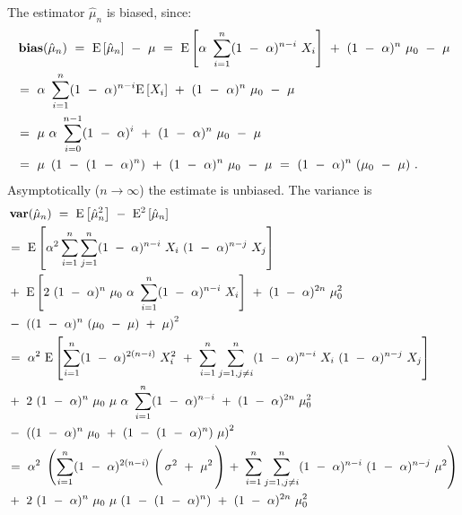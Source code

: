 \documentclass{article}
\newcommand\EXP{\mathbf{\mathrm{E}}}
\newcommand{\bias}{\mathop{\bf bias}}
\newcommand{\var}{\mathop{\bf var}}
\begin{document}
\begin{appendices}
The estimator $\hat{\mu}_n$ is biased, since:
\begin{align}
  &\bias(\hat{\mu}_n) \ = \ \EXP \left[\hat{\mu}_n \right] \ - \ \mu \ = \
  \EXP \left[  \alpha \ \sum_{i=1}^{n}  (1 \ - \ \alpha)^{n-i} \ X_i
  \right] \ + \ (1 \ - \ \alpha)^{n} \ \mu_0 \ - \ \mu \\ \nonumber
  &= \ \alpha \ \sum_{i=1}^{n}  (1 \ - \ \alpha)^{n-i} \EXP \left[X_i\right] \ + \ (1 \ - \ \alpha)^{n} \ \mu_0
 \ - \ \mu \\ \nonumber
  &= \ \mu \ \alpha \ \sum_{i=0}^{n-1}  (1 \ - \ \alpha)^i \ + \ (1 \ - \ \alpha)^{n} \ \mu_0
 \ - \ \mu \\ \nonumber
 &= \ \mu \ \left(1 \ - \  (1 \ - \ \alpha)^{n} \right)  \ + \ (1 \ - \ \alpha)^{n} \ \mu_0 \ - \ \mu
 \ = \   (1 \ - \ \alpha)^{n} \ (\mu_0 \ - \ \mu) \ .
\end{align}
Asymptotically ($n \to \infty$) the estimate is unbiased.
The variance is
\begin{align}
  &\var (\hat{\mu}_n) \ = \ \EXP \left[\hat{\mu}_n^2 \right] \ - \  \EXP^2
  \left[\hat{\mu}_n \right] \\ \nonumber
  &= \ \EXP \left[  \alpha^2 \sum_{i=1}^{n} \sum_{j=1}^{n}
    (1 \ - \ \alpha)^{n-i} \ X_i\ (1 \ - \ \alpha)^{n-j} \ X_j\right]
    \\ \nonumber 
    &+ \ \EXP \left[2\ (1 \ - \ \alpha)^{n} \ \mu_0 \ \alpha \ \sum_{i=1}^{n}  (1 \  - \ \alpha)^{n-i} \ X_i  \right] \ + \ (1 \ - \ \alpha)^{2n} \ \mu_0^2 
    \\ \nonumber &- \
     \left( (1 \ - \ \alpha)^{n} \ (\mu_0 \ - \ \mu) \ + \ \mu \right)^2 \\ \nonumber
  &= \ \alpha^2 \ \EXP \left[ \sum_{i=1}^{n}
    (1 \ - \ \alpha)^{2(n-i)} \ X_i^2 \ + \  \sum_{i=1}^{n} \sum_{j=1,j\not=i}^{n}
    (1 \ - \ \alpha)^{n-i} \ X_i\ (1 \ - \ \alpha)^{n-j} \ X_j\right]
    \\ \nonumber 
    &+ \ 2\ (1 \ - \ \alpha)^{n} \ \mu_0 \ \mu \ \alpha \ \sum_{i=1}^{n}  (1 \  - \ \alpha)^{n-i}  \ + \ (1 \ - \ \alpha)^{2n} \ \mu_0^2 
      \\ \nonumber &- \ \left( (1 \ - \ \alpha)^{n} \ \mu_0 \ + \ (1 \ - \  (1 \ - \ \alpha)^{n} ) \ \mu  \right)^2 \\ \nonumber
  &= \ \alpha^2 \ \left( \sum_{i=1}^{n}
    (1 \ - \ \alpha)^{2(n-i)} \ \right(\sigma^2 \ + \ \mu^2 \left) \ + \
    \sum_{i=1}^{n} \sum_{j=1,j\not=i}^{n}
    (1 \ - \ \alpha)^{n-i} \ (1\ - \ \alpha)^{n-j} \ \mu^2 \right) 
    \\ \nonumber 
    &+ \ 2\ (1 \ - \ \alpha)^{n} \ \mu_0 \ \mu \ (1 \ - \  (1 \  - \ \alpha)^{n})  \ + \ (1 \ - \ \alpha)^{2n} \ \mu_0^2     \\ \nonumber 

\end{align}
\end{appendices}
\end{document}
